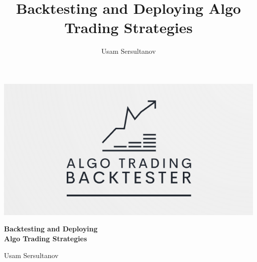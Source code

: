 \documentclass[12pt, a4paper]{report} %
\title{Backtesting and Deploying Algo Trading Strategies}
\author{Usam Sersultanov}
\begin{document}
\begin{titlepage}
    \centering

	\vspace*{-2cm} %
    \includegraphics[scale=1, width=\textwidth, keepaspectratio]{./imgs/logo8.png}
	\vspace*{1cm}

    {\Huge \bfseries Backtesting and Deploying \\
    Algo Trading Strategies\par}
    \vspace{1cm}
	
    {\Large Usam Sersultanov\par}
    \vspace{5cm}

\end{titlepage}
\end{document}

